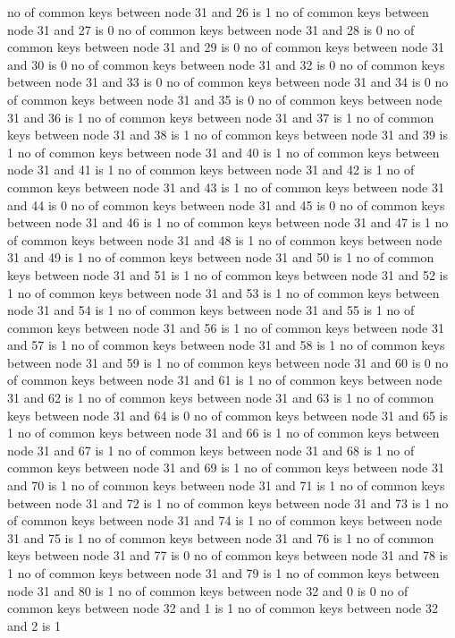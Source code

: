 no of common keys between node 31 and 26 is 1
no of common keys between node 31 and 27 is 0
no of common keys between node 31 and 28 is 0
no of common keys between node 31 and 29 is 0
no of common keys between node 31 and 30 is 0
no of common keys between node 31 and 32 is 0
no of common keys between node 31 and 33 is 0
no of common keys between node 31 and 34 is 0
no of common keys between node 31 and 35 is 0
no of common keys between node 31 and 36 is 1
no of common keys between node 31 and 37 is 1
no of common keys between node 31 and 38 is 1
no of common keys between node 31 and 39 is 1
no of common keys between node 31 and 40 is 1
no of common keys between node 31 and 41 is 1
no of common keys between node 31 and 42 is 1
no of common keys between node 31 and 43 is 1
no of common keys between node 31 and 44 is 0
no of common keys between node 31 and 45 is 0
no of common keys between node 31 and 46 is 1
no of common keys between node 31 and 47 is 1
no of common keys between node 31 and 48 is 1
no of common keys between node 31 and 49 is 1
no of common keys between node 31 and 50 is 1
no of common keys between node 31 and 51 is 1
no of common keys between node 31 and 52 is 1
no of common keys between node 31 and 53 is 1
no of common keys between node 31 and 54 is 1
no of common keys between node 31 and 55 is 1
no of common keys between node 31 and 56 is 1
no of common keys between node 31 and 57 is 1
no of common keys between node 31 and 58 is 1
no of common keys between node 31 and 59 is 1
no of common keys between node 31 and 60 is 0
no of common keys between node 31 and 61 is 1
no of common keys between node 31 and 62 is 1
no of common keys between node 31 and 63 is 1
no of common keys between node 31 and 64 is 0
no of common keys between node 31 and 65 is 1
no of common keys between node 31 and 66 is 1
no of common keys between node 31 and 67 is 1
no of common keys between node 31 and 68 is 1
no of common keys between node 31 and 69 is 1
no of common keys between node 31 and 70 is 1
no of common keys between node 31 and 71 is 1
no of common keys between node 31 and 72 is 1
no of common keys between node 31 and 73 is 1
no of common keys between node 31 and 74 is 1
no of common keys between node 31 and 75 is 1
no of common keys between node 31 and 76 is 1
no of common keys between node 31 and 77 is 0
no of common keys between node 31 and 78 is 1
no of common keys between node 31 and 79 is 1
no of common keys between node 31 and 80 is 1
no of common keys between node 32 and 0 is 0
no of common keys between node 32 and 1 is 1
no of common keys between node 32 and 2 is 1
